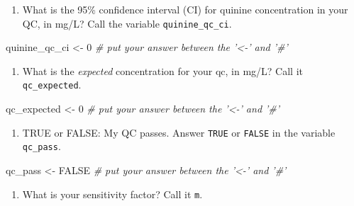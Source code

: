 \documentclass[]{tufte-book}
\newenvironment{Shaded}{}{}
\newcommand{\CommentTok}[1]{\textcolor[rgb]{0.38,0.63,0.69}{\textit{#1}}}
\newcommand{\DecValTok}[1]{\textcolor[rgb]{0.25,0.63,0.44}{#1}}
\newcommand{\NormalTok}[1]{#1}
\newcommand{\OtherTok}[1]{\textcolor[rgb]{0.00,0.44,0.13}{#1}}
\newcommand{\StringTok}[1]{\textcolor[rgb]{0.25,0.44,0.63}{#1}}
\providecommand{\tightlist}{%
  \setlength{\itemsep}{0pt}\setlength{\parskip}{0pt}}
\begin{document}
\begin{enumerate}
\def\labelenumi{\arabic{enumi}.}
\setcounter{enumi}{3}
\tightlist
\item
  What is the 95\% confidence interval (CI) for quinine concentration in your QC, in mg/L? Call the variable \texttt{quinine\_qc\_ci}.
\end{enumerate}

\begin{Shaded}
\begin{Highlighting}[]
\NormalTok{quinine_qc_ci <-}\StringTok{ }\DecValTok{0}     \CommentTok{# put your answer between the '<-' and '#'}
\end{Highlighting}
\end{Shaded}

\begin{enumerate}
\def\labelenumi{\arabic{enumi}.}
\setcounter{enumi}{4}
\tightlist
\item
  What is the \emph{expected} concentration for your qc, in mg/L? Call it \texttt{qc\_expected}.
\end{enumerate}

\begin{Shaded}
\begin{Highlighting}[]
\NormalTok{qc_expected <-}\StringTok{ }\DecValTok{0}     \CommentTok{# put your answer between the '<-' and '#'}
\end{Highlighting}
\end{Shaded}

\begin{enumerate}
\def\labelenumi{\arabic{enumi}.}
\setcounter{enumi}{5}
\tightlist
\item
  TRUE or FALSE: My QC passes. Answer \texttt{TRUE} or \texttt{FALSE} in the variable \texttt{qc\_pass}.
\end{enumerate}

\begin{Shaded}
\begin{Highlighting}[]
\NormalTok{qc_pass <-}\StringTok{ }\OtherTok{FALSE}     \CommentTok{# put your answer between the '<-' and '#'}
\end{Highlighting}
\end{Shaded}

\begin{enumerate}
\def\labelenumi{\arabic{enumi}.}
\setcounter{enumi}{6}
\tightlist
\item
  What is your sensitivity factor? Call it \texttt{m}.
\end{enumerate}
\end{document}
